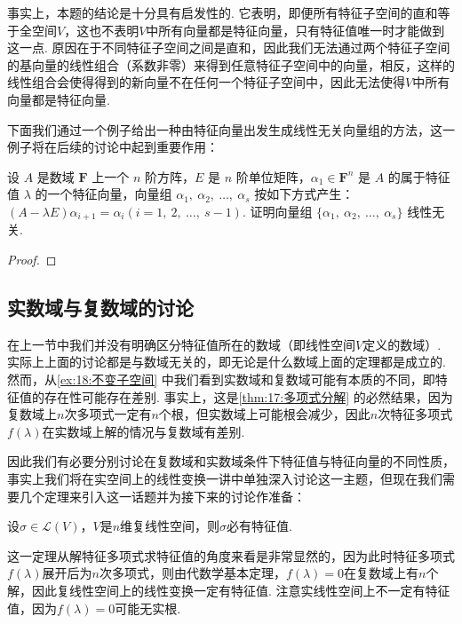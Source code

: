 事实上，本题的结论是十分具有启发性的. 它表明，即便所有特征子空间的直和等于全空间$V$，这也不表明$V$中所有向量都是特征向量，只有特征值唯一时才能做到这一点. 原因在于不同特征子空间之间是直和，因此我们无法通过两个特征子空间的基向量的线性组合（系数非零）来得到任意特征子空间中的向量，相反，这样的线性组合会使得得到的新向量不在任何一个特征子空间中，因此无法使得$V$中所有向量都是特征向量.

下面我们通过一个例子给出一种由特征向量出发生成线性无关向量组的方法，这一例子将在后续的讨论中起到重要作用：
\begin{example} \label{ex:15:特征向量生成线性无关组}
    设 $A$ 是数域 $\mathbf{F}$ 上一个 $n$ 阶方阵，$E$ 是 $n$ 阶单位矩阵，$\alpha_1 \in \mathbf{F}^n$ 是 $A$ 的属于特征值 $\lambda$ 的一个特征向量，向量组 $\alpha_1,\ \alpha_2,\ \dots,\ \alpha_s$ 按如下方式产生：$(A-\lambda E)\alpha_{i+1}=\alpha_i(i=1,\ 2,\ \dots,\ s-1)$. 证明向量组 $\{\alpha_1,\ \alpha_2,\ \dots,\ \alpha_s\}$ 线性无关.
\end{example}

\begin{proof}

\end{proof}

\subsection{实数域与复数域的讨论}

在上一节中我们并没有明确区分特征值所在的数域（即线性空间$V$定义的数域）. 实际上上面的讨论都是与数域无关的，即无论是什么数域上面的定理都是成立的. 然而，从\autoref{ex:18:不变子空间} 中我们看到实数域和复数域可能有本质的不同，即特征值的存在性可能存在差别. 事实上，这是\autoref{thm:17:多项式分解} 的必然结果，因为复数域上$n$次多项式一定有$n$个根，但实数域上可能根会减少，因此$n$次特征多项式$f(\lambda)$在实数域上解的情况与复数域有差别.

因此我们有必要分别讨论在复数域和实数域条件下特征值与特征向量的不同性质，事实上我们将在实空间上的线性变换一讲中单独深入讨论这一主题，但现在我们需要几个定理来引入这一话题并为接下来的讨论作准备：
\begin{theorem}\label{thm:18:复数域上的特征值}
    设$\sigma\in \mathcal{L}(V)$，$V$是$n$维复线性空间，则$\sigma$必有特征值.
\end{theorem}

这一定理从解特征多项式求特征值的角度来看是非常显然的，因为此时特征多项式$f(\lambda)$展开后为$n$次多项式，则由代数学基本定理，$f(\lambda)=0$在复数域上有$n$个解，因此复线性空间上的线性变换一定有特征值. 注意实线性空间上不一定有特征值，因为$f(\lambda)=0$可能无实根.

